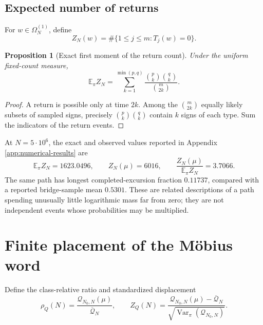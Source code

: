 \documentclass[11pt,reqno]{amsart}
\numberwithin{equation}{section}
\theoremstyle{plain}
\newtheorem{proposition}[theorem]{Proposition}
\theoremstyle{definition}
\theoremstyle{remark}
\newcommand{\E}{\mathbb E}
\newcommand{\Var}{\operatorname{Var}}
\newcommand{\Om}{\Omega}
\newcommand{\QF}{\mathcal Q}
\begin{document}
\subsection{Expected number of returns}
\label{subsec:expected-return-count}

For \(w\in\Om_N^{(1)}\), define
\begin{equation}
Z_N(w)=\#\{1\leq j\leq m:T_j(w)=0\}.
\label{eq:return-count}
\end{equation}

\begin{proposition}[Exact first moment of the return count]
\label{prop:exact-return-mean}
Under the uniform fixed-count measure,
\begin{equation}
\E_{\pi}Z_N
=\sum_{k=1}^{\min(p,q)}
\frac{\binom pk\binom qk}{\binom m{2k}}.
\label{eq:exact-return-mean}
\end{equation}
\end{proposition}

\begin{proof}
A return is possible only at time \(2k\).  Among the
\(\binom m{2k}\) equally likely subsets of sampled signs, precisely
\(\binom pk\binom qk\) contain \(k\) signs of each type.  Sum the indicators
of the return events.
\end{proof}

At \(N=5\cdot10^6\), the exact and observed values reported in Appendix
\ref{app:numerical-results} are
\begin{equation}
\E_{\pi}Z_N=1623.0496,\qquad
Z_N(\mu)=6016,\qquad
\frac{Z_N(\mu)}{\E_{\pi}Z_N}=3.7066.
\label{eq:five-million-return-excess}
\end{equation}
The same path has longest completed-excursion fraction \(0.11737\), compared
with a reported bridge-sample mean \(0.5301\).  These are related
descriptions of a path spending unusually little logarithmic mass far from
zero; they are not independent events whose probabilities may be
multiplied.

\section{Finite placement of the M\"obius word}
\label{sec:finite-placement}

Define the class-relative ratio and standardized displacement
\begin{equation}
\rho_Q(N)=\frac{\QF_{N_0,N}(\mu)}{\overline{\QF}_N},
\qquad
Z_Q(N)=\frac{\QF_{N_0,N}(\mu)-\overline{\QF}_N}
{\sqrt{\Var_{\pi}(\QF_{N_0,N})}}.
\label{eq:ratio-and-standardized-displacement}
\end{equation}
\end{document}
